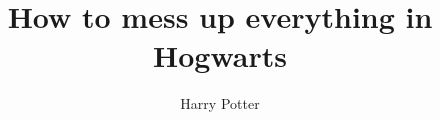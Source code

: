\documentclass{swfuproposal}
\title{How to mess up everything in Hogwarts}
\author{Harry Potter}
\begin{document}
\makeproposal{}
\end{document}
